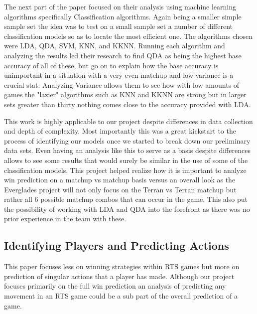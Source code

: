 \documentclass[a4paper,12pt]{report}
\begin{document}
The next part of the paper focused on their analysis using machine learning algorithms specifically Classification algorithms. Again being a smaller simple sample set the idea was to test on a small sample set a number of different classification models so as to locate the most efficient one. The algorithms chosen were LDA, QDA, SVM, KNN, and KKNN. Running each algorithm and analyzing the results led their research to find QDA as being the highest base accuracy of all of these, but go on to explain how the base accuracy is unimportant in a situation with a very even matchup and low variance is a crucial stat. Analyzing Variance allows them to see how with low amounts of games the "lazier" algorithms such as KNN and KKNN are strong but in larger sets greater than thirty nothing comes close to the accuracy provided with LDA.

This work is highly applicable to our project despite differences in data collection and depth of complexity. Most importantly this was a great kickstart to the process of identifying our models once we started to break down our preliminary data sets. Even having an analysis like this to serve as a basis despite differences allows to see some results that would surely be similar in the use of some of the classification models. This project helped realize how it is important to analyze win prediction on a matchup vs matchup basis versus an overall look as the Everglades project will not only focus on the Terran vs Terran matchup but rather all 6 possible matchup combos that can occur in the game. This also put the possibility of working with LDA and QDA into the forefront as there was no prior experience in the team with these. 

\subsection{Identifying Players and Predicting Actions}

This paper focuses less on winning strategies within RTS games but more on prediction of singular actions that a player has made. Although our project focuses primarily on the full win prediction an analysis of predicting any movement in an RTS game could be a sub part of the overall prediction of a game. 
\end{document}
